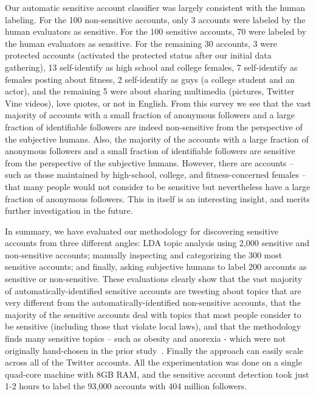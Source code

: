 \documentclass[conference]{IEEEtran}
\begin{document}
Our automatic sensitive account classifier was largely consistent with the human labeling. For the 100 non-sensitive accounts, only 3 accounts were labeled by the human evaluators as sensitive. 
For the 100 sensitive accounts, 70 were labeled by the human evaluators as sensitive. For the remaining 30 accounts, 3 were protected accounts (activated the protected status after our initial data gathering), 13 self-identify as high school and college females, 7 self-identify as females posting about fitness, 2 self-identify as guys (a college student and an actor), and the remaining 5 were about sharing multimedia (pictures, Twitter Vine videos), love quotes, or not in English. From this survey we  see that the vast majority of accounts with a small fraction of anonymous followers and a large fraction of identifiable followers are indeed non-sensitive from the perspective of the subjective humans.  Also, the majority of the accounts with a large fraction of anonymous followers and a small fraction of identifiable followers are sensitive from the perspective of the subjective humans. However, there are accounts -- such as those maintained by high-school, college, and fitness-concerned females -- that many people would not consider to be sensitive but nevertheless have a large fraction of anonymous followers. 
This in itself is an interesting insight, and merits further investigation in the future. 

In summary, we have evaluated our methodology for discovering sensitive accounts from three different angles: LDA topic analysis using 2,000 sensitive and non-sensitive accounts; manually inspecting and categorizing the 300 most sensitive accounts; and finally, asking subjective humans to label 200 accounts as sensitive or non-sensitive. These evaluations clearly show that the vast majority of automatically-identified sensitive accounts are tweeting about topics that are very different from the automatically-identified non-sensitive accounts, that the majority of the  sensitive accounts deal with topics that most people consider to be sensitive
(including those that violate local laws), and that the methodology finds many sensitive topics -- such as obesity and anorexia - which were not originally hand-chosen in the prior study~\cite{PeddintiCOSN2014}. Finally the approach can easily scale across all of the Twitter accounts. All the experimentation was done on a single quad-core machine with 8GB RAM, and the sensitive account detection took just 1-2 hours to label the 93,000 accounts with 404 million followers.
\end{document}
